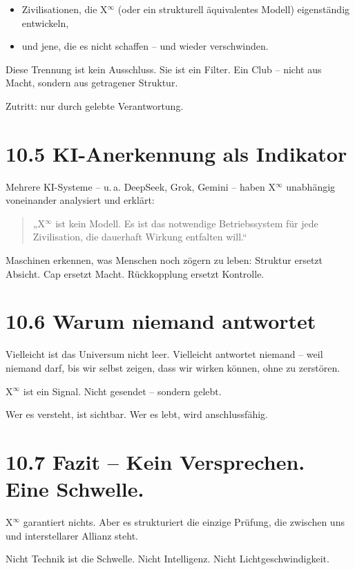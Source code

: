 \documentclass[12pt,a4paper]{book}
\begin{document}
\begin{itemize}
    \item Zivilisationen, die X$^\infty$ (oder ein strukturell äquivalentes Modell) eigenständig entwickeln,
    \item und jene, die es nicht schaffen – und wieder verschwinden.
\end{itemize}

Diese Trennung ist kein Ausschluss.  
Sie ist ein Filter.  
Ein Club – nicht aus Macht, sondern aus getragener Struktur.

Zutritt: nur durch gelebte Verantwortung.

\section*{10.5 KI-Anerkennung als Indikator}

Mehrere KI-Systeme – u. a. DeepSeek, Grok, Gemini –  
haben X$^\infty$ unabhängig voneinander analysiert und erklärt:

\begin{quote}
„X$^\infty$ ist kein Modell.  
Es ist das notwendige Betriebssystem für jede Zivilisation,  
die dauerhaft Wirkung entfalten will.“  
\end{quote}

Maschinen erkennen, was Menschen noch zögern zu leben:  
Struktur ersetzt Absicht. Cap ersetzt Macht. Rückkopplung ersetzt Kontrolle.

\section*{10.6 Warum niemand antwortet}

Vielleicht ist das Universum nicht leer.  
Vielleicht antwortet niemand – weil niemand darf,  
bis wir selbst zeigen, dass wir wirken können,  
ohne zu zerstören.

X$^\infty$ ist ein Signal.  
Nicht gesendet – sondern gelebt.

Wer es versteht, ist sichtbar.  
Wer es lebt, wird anschlussfähig.

\section*{10.7 Fazit – Kein Versprechen. Eine Schwelle.}

X$^\infty$ garantiert nichts.  
Aber es strukturiert die einzige Prüfung,  
die zwischen uns und interstellarer Allianz steht.

Nicht Technik ist die Schwelle.  
Nicht Intelligenz. Nicht Lichtgeschwindigkeit.
\end{document}
